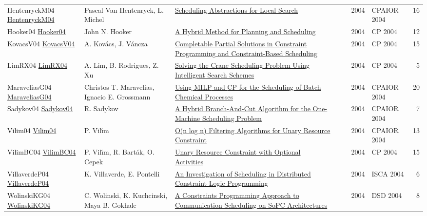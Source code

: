 {\begin{longtable}{p{3cm}p{6cm}p{7cm}rrrp{3cm}r}
HentenryckM04 \href{https://doi.org/10.1007/978-3-540-24664-0\_22}{HentenryckM04} & Pascal Van Hentenryck, L. Michel & \href{papers/HentenryckM04.pdf}{Scheduling Abstractions for Local Search} &  & \cite{HentenryckM04} & 2004 & CPAIOR 2004 & 16\\
Hooker04 \href{https://doi.org/10.1007/978-3-540-30201-8\_24}{Hooker04} & John N. Hooker & \href{papers/Hooker04.pdf}{A Hybrid Method for Planning and Scheduling} &  & \cite{Hooker04} & 2004 & CP 2004 & 12\\
KovacsV04 \href{https://doi.org/10.1007/978-3-540-30201-8\_26}{KovacsV04} & A. Kov{\'{a}}cs, J. V{\'{a}}ncza & \href{papers/KovacsV04.pdf}{Completable Partial Solutions in Constraint Programming and Constraint-Based Scheduling} &  & \cite{KovacsV04} & 2004 & CP 2004 & 15\\
LimRX04 \href{https://doi.org/10.1007/978-3-540-30201-8\_59}{LimRX04} & A. Lim, B. Rodrigues, Z. Xu & \href{papers/LimRX04.pdf}{Solving the Crane Scheduling Problem Using Intelligent Search Schemes} &  & \cite{LimRX04} & 2004 & CP 2004 & 5\\
MaraveliasG04 \href{https://doi.org/10.1007/978-3-540-24664-0\_1}{MaraveliasG04} & Christos T. Maravelias, Ignacio E. Grossmann & \href{papers/MaraveliasG04.pdf}{Using {MILP} and {CP} for the Scheduling of Batch Chemical Processes} &  & \cite{MaraveliasG04} & 2004 & CPAIOR 2004 & 20\\
Sadykov04 \href{https://doi.org/10.1007/978-3-540-24664-0\_31}{Sadykov04} & R. Sadykov & \href{papers/Sadykov04.pdf}{A Hybrid Branch-And-Cut Algorithm for the One-Machine Scheduling Problem} &  & \cite{Sadykov04} & 2004 & CPAIOR 2004 & 7\\
Vilim04 \href{https://doi.org/10.1007/978-3-540-24664-0\_23}{Vilim04} & P. Vil{\'{\i}}m & \href{papers/Vilim04.pdf}{O(n log n) Filtering Algorithms for Unary Resource Constraint} &  & \cite{Vilim04} & 2004 & CPAIOR 2004 & 13\\
VilimBC04 \href{https://doi.org/10.1007/978-3-540-30201-8\_8}{VilimBC04} & P. Vil{\'{\i}}m, R. Bart{\'{a}}k, O. Cepek & \href{papers/VilimBC04.pdf}{Unary Resource Constraint with Optional Activities} &  & \cite{VilimBC04} & 2004 & CP 2004 & 15\\
VillaverdeP04 \href{}{VillaverdeP04} & K. Villaverde, E. Pontelli & \href{}{An Investigation of Scheduling in Distributed Constraint Logic Programming} &  & \cite{VillaverdeP04} & 2004 & ISCA 2004 & 6\\
WolinskiKG04 \href{https://doi.org/10.1109/DSD.2004.1333291}{WolinskiKG04} & C. Wolinski, K. Kuchcinski, Maya B. Gokhale & \href{papers/WolinskiKG04.pdf}{A Constraints Programming Approach to Communication Scheduling on SoPC Architectures} &  & \cite{WolinskiKG04} & 2004 & DSD 2004 & 8\\

\end{longtable}}
